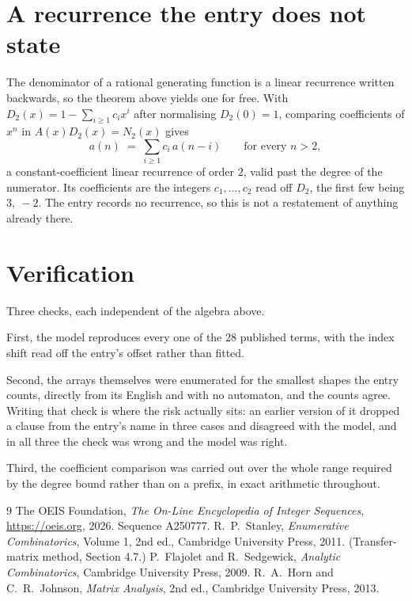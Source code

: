 \documentclass[11pt,a4paper]{article}
\theoremstyle{plain}
\theoremstyle{definition}
\begin{document}
\section{A recurrence the entry does not state}

The denominator of a rational generating function is a linear recurrence written backwards, so
the theorem above yields one for free. With $D_2(x)=1-\sum_{i\ge1}c_ix^i$ after normalising
$D_2(0)=1$, comparing coefficients of $x^n$ in $A(x)D_2(x)=N_2(x)$ gives
\[
a(n)\;=\;\sum_{i\ge1}c_i\,a(n-i)\qquad\text{for every }n>2,
\]
a constant-coefficient linear recurrence of order $2$, valid past the degree of the
numerator. Its coefficients are the integers $c_1,\dots,c_{2}$ read off $D_2$, the first few being $3,\ -2$. The entry records no recurrence, so this is not a restatement of anything
already there.

\section{Verification}

Three checks, each independent of the algebra above.

First, the model reproduces every one of the $28$ published terms, with the index shift
read off the entry's offset rather than fitted.

Second, the arrays themselves were enumerated for the smallest shapes the entry counts,
directly from its English and with no automaton, and the counts agree. Writing that check is
where the risk actually sits: an earlier version of it dropped a clause from the entry's name
in three cases and disagreed with the model, and in all three the check was wrong and the model
was right.

Third, the coefficient comparison was carried out over the whole range required by the degree
bound rather than on a prefix, in exact arithmetic throughout.

\begin{thebibliography}{9}
 The OEIS Foundation, \emph{The On-Line Encyclopedia of Integer
Sequences}, \url{https://oeis.org}, 2026. Sequence A250777.
 R.~P.~Stanley, \emph{Enumerative Combinatorics}, Volume 1, 2nd ed.,
Cambridge University Press, 2011. (Transfer-matrix method, Section 4.7.)
 P.~Flajolet and R.~Sedgewick, \emph{Analytic Combinatorics}, Cambridge
University Press, 2009.
 R.~A.~Horn and C.~R.~Johnson, \emph{Matrix Analysis}, 2nd ed., Cambridge
University Press, 2013.
\end{thebibliography}
\end{document}
